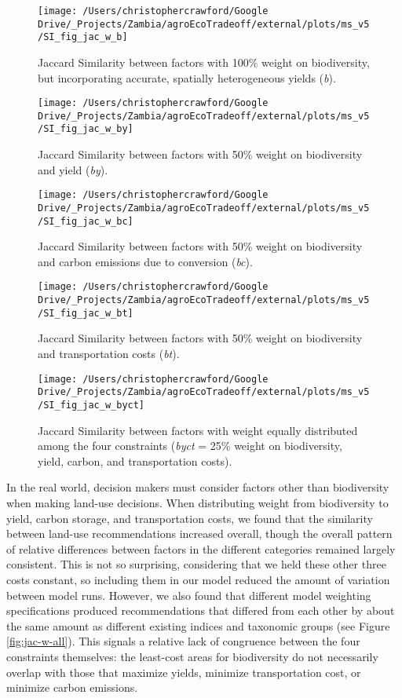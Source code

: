 \documentclass[
]{article}
\begin{document}
\begin{figure}
\texttt{[image: /Users/christophercrawford/Google Drive/\_Projects/Zambia/agroEcoTradeoff/external/plots/ms\_v5/SI\_fig\_jac\_w\_b]} \caption{Jaccard Similarity between factors with 100\% weight on biodiversity, but incorporating accurate, spatially heterogeneous yields (\emph{b}).}\label{fig:jac-w-b}
\end{figure}

\begin{figure}
\texttt{[image: /Users/christophercrawford/Google Drive/\_Projects/Zambia/agroEcoTradeoff/external/plots/ms\_v5/SI\_fig\_jac\_w\_by]} \caption{Jaccard Similarity between factors with 50\% weight on biodiversity and yield (\emph{by}).}\label{fig:jac-w-by}
\end{figure}

\begin{figure}
\texttt{[image: /Users/christophercrawford/Google Drive/\_Projects/Zambia/agroEcoTradeoff/external/plots/ms\_v5/SI\_fig\_jac\_w\_bc]} \caption{Jaccard Similarity between factors with 50\% weight on biodiversity and carbon emissions due to conversion (\emph{bc}).}\label{fig:jac-w-bc}
\end{figure}

\begin{figure}
\texttt{[image: /Users/christophercrawford/Google Drive/\_Projects/Zambia/agroEcoTradeoff/external/plots/ms\_v5/SI\_fig\_jac\_w\_bt]} \caption{Jaccard Similarity between factors with 50\% weight on biodiversity and transportation costs (\emph{bt}).}\label{fig:jac-w-bt}
\end{figure}

\begin{figure}
\texttt{[image: /Users/christophercrawford/Google Drive/\_Projects/Zambia/agroEcoTradeoff/external/plots/ms\_v5/SI\_fig\_jac\_w\_byct]} \caption{Jaccard Similarity between factors with weight equally distributed among the four constraints (\emph{byct} = 25\% weight on biodiversity, yield, carbon, and transportation costs).}\label{fig:jac-w-byct}
\end{figure}

In the real world, decision makers must consider factors other than biodiversity when making land-use decisions. When distributing weight from biodiversity to yield, carbon storage, and transportation costs, we found that the similarity between land-use recommendations increased overall, though the overall pattern of relative differences between factors in the different categories remained largely consistent. This is not so surprising, considering that we held these other three costs constant, so including them in our model reduced the amount of variation between model runs. However, we also found that different model weighting specifications produced recommendations that differed from each other by about the same amount as different existing indices and taxonomic groups (see Figure \ref{fig:jac-w-all}). This signals a relative lack of congruence between the four constraints themselves: the least-cost areas for biodiversity do not necessarily overlap with those that maximize yields, minimize transportation cost, or minimize carbon emissions.
\end{document}

